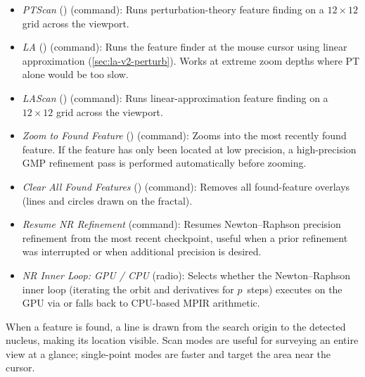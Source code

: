 \begin{itemize}
\begin{itemize}
\begin{itemize}
          mouse cursor using perturbation theory (\cref{sec:perturbation-concept}).
          Requires a reference orbit and works at deeper zooms than Direct.
          \item \emph{PTScan} () (command): Runs perturbation-theory
          feature finding on a $12\times12$ grid across the viewport.
          \item \emph{LA} (\code{,}) (command): Runs the feature finder at the
          mouse cursor using linear approximation (\cref{sec:la-v2-perturb}).
          Works at extreme zoom depths where PT alone would be too slow.
          \item \emph{LAScan} (\code{<}) (command): Runs linear-approximation
          feature finding on a $12\times12$ grid across the viewport.
          \item \emph{Zoom to Found Feature} () (command): Zooms into
          the most recently found feature.  If the feature has only been located
          at low precision, a high-precision GMP refinement pass is performed
          automatically before zooming.
          \item \emph{Clear All Found Features} (\code{>}) (command): Removes
          all found-feature overlays (lines and circles drawn on the fractal).
          \item \emph{Resume NR Refinement} (command): Resumes
          Newton--Raphson precision refinement from the most recent checkpoint,
          useful when a prior refinement was interrupted or when additional
          precision is desired.
          \item \emph{NR Inner Loop: GPU / CPU} (radio): Selects
          whether the Newton--Raphson inner loop (iterating the orbit and
          derivatives for $p$~steps) executes on the GPU via
           or falls back to CPU-based MPIR arithmetic.
        \end{itemize}
      When a feature is found, a line is drawn from the search origin to the
      detected nucleus, making its location visible.  Scan modes are useful for
      surveying an entire view at a glance; single-point modes are faster and
      target the area near the cursor.
    \end{itemize}


\end{itemize}

